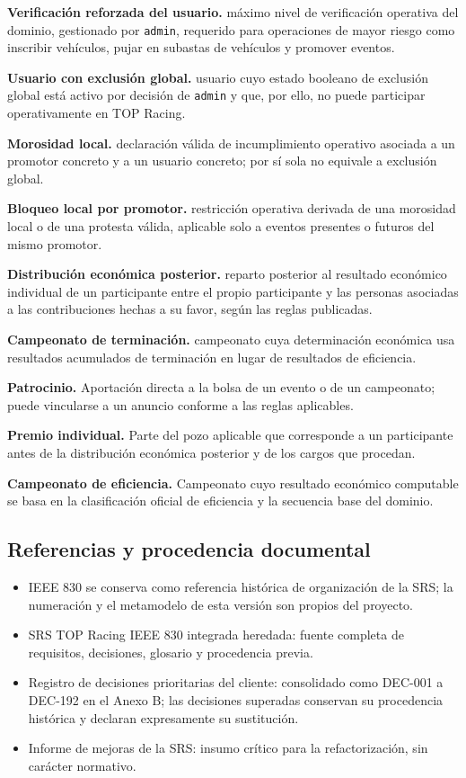 \documentclass[10pt,letterpaper]{article}
\begin{document}
\noindent\textbf{Verificación reforzada del usuario.} máximo nivel de verificación operativa del dominio, gestionado por \texttt{admin}, requerido para operaciones de mayor riesgo como inscribir vehículos, pujar en subastas de vehículos y promover eventos.\par
\noindent\textbf{Usuario con exclusión global.} usuario cuyo estado booleano de exclusión global está activo por decisión de \texttt{admin} y que, por ello, no puede participar operativamente en TOP Racing.\par
\noindent\textbf{Morosidad local.} declaración válida de incumplimiento operativo asociada a un promotor concreto y a un usuario concreto; por sí sola no equivale a exclusión global.\par
\noindent\textbf{Bloqueo local por promotor.} restricción operativa derivada de una morosidad local o de una protesta válida, aplicable solo a eventos presentes o futuros del mismo promotor.\par
\noindent\textbf{Distribución económica posterior.} reparto posterior al resultado económico individual de un participante entre el propio participante y las personas asociadas a las contribuciones hechas a su favor, según las reglas publicadas.\par
\noindent\textbf{Campeonato de terminación.} campeonato cuya determinación económica usa resultados acumulados de terminación en lugar de resultados de eficiencia.\par
\noindent\textbf{Patrocinio.} Aportación directa a la bolsa de un evento o de un campeonato; puede vincularse a un anuncio conforme a las reglas aplicables.\par
\noindent\textbf{Premio individual.} Parte del pozo aplicable que corresponde a un participante antes de la distribución económica posterior y de los cargos que procedan.\par
\noindent\textbf{Campeonato de eficiencia.} Campeonato cuyo resultado económico computable se basa en la clasificación oficial de eficiencia y la secuencia base del dominio.\par
\subsection{Referencias y procedencia documental}
\begin{itemize}
\item IEEE 830 se conserva como referencia histórica de organización de la SRS; la numeración y el metamodelo de esta versión son propios del proyecto.
\item SRS TOP Racing IEEE 830 integrada heredada: fuente completa de requisitos, decisiones, glosario y procedencia previa.
\item Registro de decisiones prioritarias del cliente: consolidado como DEC-001 a DEC-192 en el Anexo B; las decisiones superadas conservan su procedencia histórica y declaran expresamente su sustitución.
\item Informe de mejoras de la SRS: insumo crítico para la refactorización, sin carácter normativo.
\end{itemize}
\end{document}
